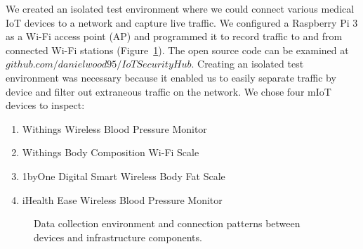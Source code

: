 We created an isolated test environment where we could connect various medical IoT devices to a network and capture live traffic. We configured a Raspberry Pi 3 as a Wi-Fi access point (AP) and programmed it to record traffic to and from connected Wi-Fi stations (Figure~\ref{fig:data-collection}). The open source code can be examined at $github.com/danielwood95/IoTSecurityHub$.  Creating an isolated test environment was necessary because it enabled us to easily separate traffic by device and filter out extraneous traffic on the network.   We chose four mIoT devices to inspect:

\begin{enumerate}
  \item Withings Wireless Blood Pressure Monitor
  \item Withings Body Composition Wi-Fi Scale
  \item 1byOne Digital Smart Wireless Body Fat Scale
  \item iHealth Ease Wireless Blood Pressure Monitor
\end{enumerate}

\begin{figure}
  \centering
  \caption{Data collection environment and connection patterns between devices and infrastructure components.}
  \label{fig:data-collection}
\end{figure}

